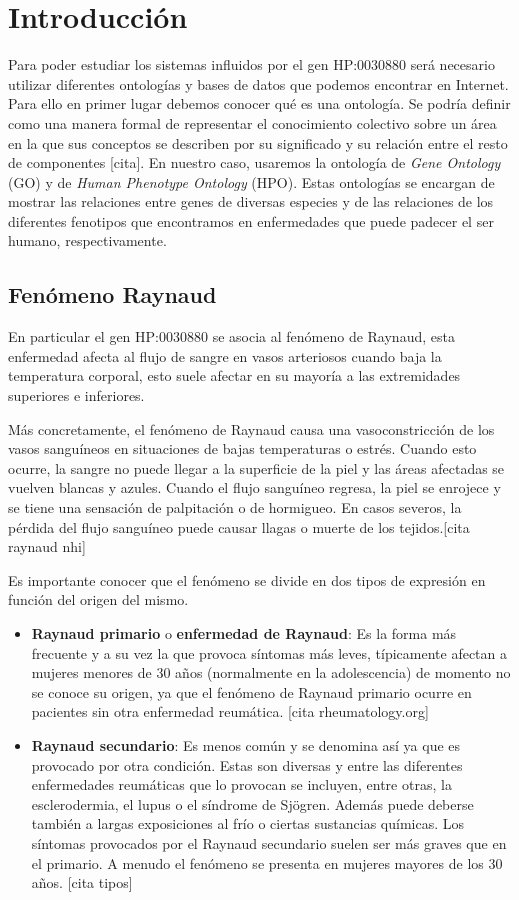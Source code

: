 \section{Introducción}

Para poder estudiar los sistemas influidos por el gen HP:0030880 será necesario utilizar diferentes ontologías y bases de datos que podemos encontrar en Internet. Para ello en primer lugar debemos conocer qué es una ontología. Se podría definir como una manera formal de representar el conocimiento colectivo sobre un área en la que sus conceptos se describen por su significado y su relación entre el resto de componentes [cita]. En nuestro caso, usaremos la ontología de \textit{Gene Ontology} (GO) y de \textit{Human Phenotype Ontology} (HPO). Estas ontologías se encargan de mostrar las relaciones entre genes de diversas especies y de las relaciones de los diferentes fenotipos que encontramos en enfermedades que puede padecer el ser humano, respectivamente.

\subsection{Fenómeno Raynaud}

En particular el gen HP:0030880 se asocia al fenómeno de Raynaud, esta enfermedad afecta al flujo de sangre en vasos arteriosos cuando baja la temperatura corporal, esto suele afectar en su mayoría a las extremidades superiores e inferiores.

Más concretamente, el fenómeno de Raynaud causa una vasoconstricción de los vasos sanguíneos en situaciones de bajas temperaturas o estrés. Cuando esto ocurre, la sangre no puede llegar a la superficie de la piel y las áreas afectadas se vuelven blancas y azules. Cuando el flujo sanguíneo regresa, la piel se enrojece y se tiene una sensación de palpitación o de hormigueo. En casos severos, la pérdida del flujo sanguíneo puede causar llagas o muerte de los tejidos.[cita raynaud nhi]

Es importante conocer que el fenómeno se divide en dos tipos de expresión en función del origen del mismo.
\begin{itemize}
	\item \textbf{Raynaud primario} o \textbf{enfermedad de Raynaud}: Es la forma más frecuente y a su vez la que provoca síntomas más leves, típicamente afectan a mujeres menores de 30 años (normalmente en la adolescencia) de momento no se conoce su origen, ya que el fenómeno de Raynaud primario ocurre en pacientes sin otra enfermedad reumática. [cita rheumatology.org]
	
	\item \textbf{Raynaud secundario}: Es menos común y se denomina así ya que es provocado por otra condición. Estas son diversas y entre las diferentes enfermedades reumáticas que lo provocan se incluyen, entre otras, la esclerodermia, el lupus o el síndrome de Sjögren. Además puede deberse también a largas exposiciones al frío o ciertas sustancias químicas. Los síntomas provocados por el Raynaud secundario suelen ser más graves que en el primario. A menudo el fenómeno se presenta en mujeres mayores de los 30 años. [cita tipos]
\end{itemize}